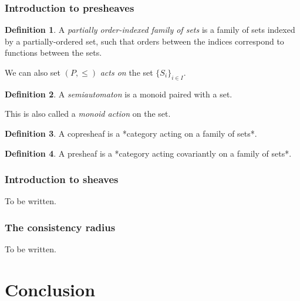 \documentclass[]             %
{NASA}                       %
\theoremstyle{definition}
\newtheorem{definition}{Definition}[section]
\begin{document}
\hypertarget{introduction-to-presheaves}{%
  \subsubsection{Introduction to
    presheaves}\label{introduction-to-presheaves}}

\begin{definition}
  A \emph{partially order-indexed family of sets} is a family of sets indexed by a partially-ordered set,
  such that orders between the indices correspond to functions between the sets.
\end{definition}

We can also set \((P, \leq)\) \emph{acts on} the set
\(\{S_i\}_{i \in I}\).

\begin{definition}
  A \emph{semiautomaton} is a monoid paired with a set.
\end{definition}

This is also called a \emph{monoid action} on the set.

\begin{definition}
  A copresheaf is a *category acting on a family of sets*.
\end{definition}

\begin{definition}
  A presheaf is a *category acting covariantly on a family of sets*.
\end{definition}

\hypertarget{introduction-to-sheaves}{%
  \subsubsection{Introduction to sheaves}\label{introduction-to-sheaves}}

To be written.

\hypertarget{the-consistency-radius}{%
  \subsubsection{The consistency radius}\label{the-consistency-radius}}

To be written.

\hypertarget{conclusion}{%
  \section{Conclusion}\label{conclusion}}

\label{sec:conclusion}
\end{document}
